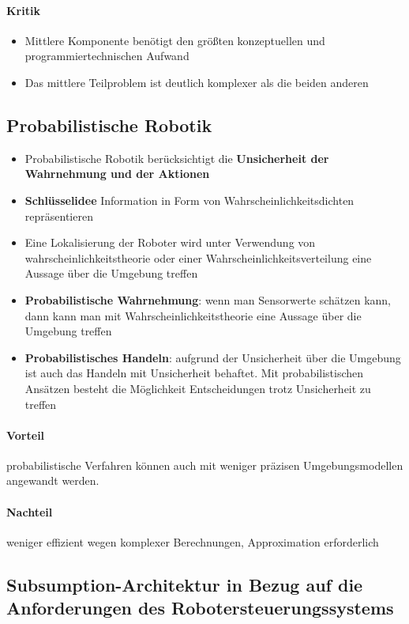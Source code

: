 \paragraph{Kritik}
\begin{itemize}
	\item Mittlere Komponente benötigt den größten konzeptuellen und programmiertechnischen Aufwand
	\item Das mittlere Teilproblem ist deutlich komplexer als die beiden anderen
\end{itemize}
\subsection{Probabilistische Robotik}
\begin{itemize}
	\item Probabilistische Robotik berücksichtigt die \textbf{Unsicherheit der Wahrnehmung und der Aktionen}
	\item \textbf{Schlüsselidee} Information in Form von Wahrscheinlichkeitsdichten repräsentieren
	\item Eine Lokalisierung der Roboter wird unter Verwendung von wahrscheinlichkeitstheorie oder einer Wahrscheinlichkeitsverteilung eine Aussage über die Umgebung treffen
	\item \textbf{Probabilistische Wahrnehmung}: wenn man Sensorwerte schätzen kann, dann kann man mit Wahrscheinlichkeitstheorie eine Aussage über die Umgebung treffen
	\item \textbf{Probabilistisches Handeln}: aufgrund der Unsicherheit über die Umgebung ist auch das Handeln mit Unsicherheit behaftet.
	Mit probabilistischen Ansätzen besteht die Möglichkeit Entscheidungen trotz Unsicherheit zu treffen
\end{itemize}
\paragraph{Vorteil} probabilistische Verfahren können auch mit weniger präzisen Umgebungsmodellen angewandt werden.
\paragraph{Nachteil} weniger effizient wegen komplexer Berechnungen, Approximation erforderlich
\subsection{Subsumption-Architektur in Bezug auf die Anforderungen des Robotersteuerungssystems}
